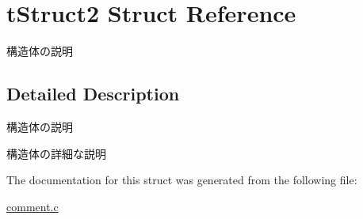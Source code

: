 \hypertarget{structtStruct2}{\section{t\+Struct2 Struct Reference}
\label{structtStruct2}
}


構造体の説明  




\subsection{Detailed Description}
構造体の説明 

構造体の詳細な説明 

The documentation for this struct was generated from the following file\+:\begin{DoxyCompactItemize}
\item 
\hyperlink{comment_8c}{comment.\+c}\end{DoxyCompactItemize}
